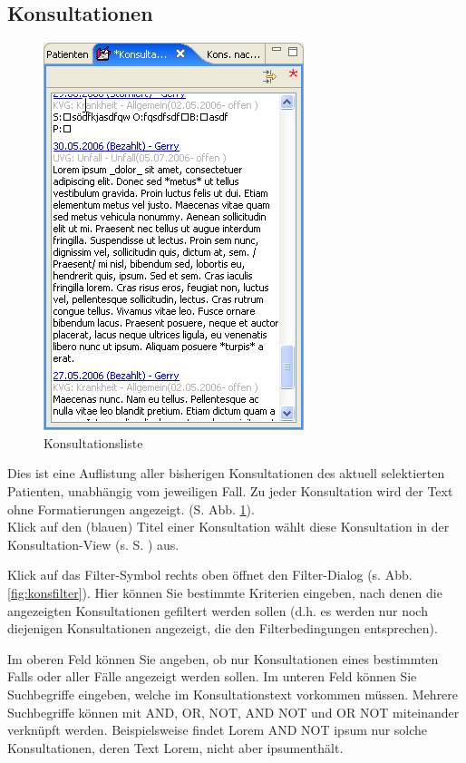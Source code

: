 \clearpage

\subsection{Konsultationen}
\label{view:konsultationen}
\begin{figure}
  \includegraphics{images/konslisteview}
  \caption{Konsultationsliste}
  \label{fig:konslisteview}
\end{figure}

Dies ist eine Auflistung aller bisherigen Konsultationen des aktuell
selektierten Patienten, unabhängig vom jeweiligen Fall.
 Zu jeder Konsultation
wird der Text ohne Formatierungen angezeigt. (S. Abb. \ref{fig:konslisteview}).\\
Klick auf den (blauen) Titel einer Konsultation wählt diese Konsultation in der
Konsultation-View (s. S. \pageref{konsview}) aus.

Klick auf das Filter-Symbol rechts oben öffnet den Filter-Dialog (s. Abb. \ref{fig:konsfilter}).
 Hier können Sie bestimmte Kriterien eingeben, nach
denen die angezeigten Konsultationen gefiltert werden sollen (d.h. es werden nur
noch diejenigen Konsultationen angezeigt, die den Filterbedingungen
entsprechen).

Im oberen Feld können Sie angeben, ob nur Konsultationen eines bestimmten Falls
oder aller Fälle angezeigt werden sollen. Im unteren Feld können Sie
Suchbegriffe eingeben, welche im Konsultationstext vorkommen müssen. Mehrere
Suchbegriffe können mit AND, OR, NOT, AND NOT und OR NOT miteinander verknüpft werden.
Beispielsweise findet \glqq Lorem AND NOT ipsum\grqq{} nur solche Konsultationen, deren
Text \glqq Lorem\grqq, nicht aber \glqq ipsum\grqq{}enthält.

